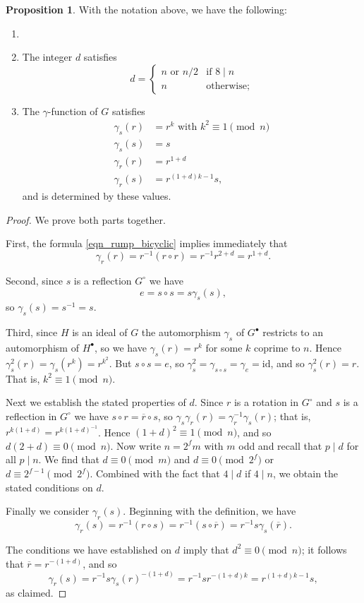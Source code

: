 \documentclass[reqno]{amsart}
\theoremstyle{definition}
\newtheorem{proposition}[theorem]{Proposition}
\renewcommand{\bar}{\overline}
\newcommand{\id}{\mathrm{id}}
\begin{document}
\begin{proposition} \label{prop_bicylic_necessary} 
With the notation above, we have the following:
\begin{enumerate}
\item[]
\item The integer $ d $ satisfies
\[ d= \begin{cases} 
n \mbox{ or } n/2 & \mbox{if } 8 \mid n \\
n & \mbox{otherwise;} \end{cases} \]
\item The $ \gamma $-function of $ G $ satisfies
\begin{align*}
\gamma_{s}(r) &= r^{k} \mbox{ with } k^{2} \equiv 1 \pmod{n} \\
\gamma_{s}(s) &= s \\
\gamma_{r}(r) &= r^{1+d} \\
\gamma_{r}(s) &= r^{(1+d)k-1}s,
\end{align*}
and is determined by these values. 
\end{enumerate}
\end{proposition}
\begin{proof}
We prove both parts together. 

First, the formula \eqref{eqn_rump_bicyclic} implies immediately that
\[ \gamma_{r}(r) = r^{-1}(r \circ r) = r^{-1}r^{2+d} = r^{1+d}. \]

Second, since $ s $ is a reflection $ G^{\circ} $ we have 
\[ e = s \circ s = s \gamma_{s}(s), \]
so $ \gamma_{s}(s)= s^{-1} = s $.

Third, since $ H $ is an ideal of $ G $ the automorphism $ \gamma_{s} $ of $ G^{\bullet} $ restricts to an automorphism of $ H^{\bullet} $, so we have $ \gamma_{s}(r) = r^{k} $ for some $ k $ coprime to $ n $. Hence $ \gamma_{s}^{2}(r) = \gamma_s(r^k)=r^{k^{2}} $. But $ s \circ s = e $, so $ \gamma_{s}^{2} =  \gamma_{s \circ s} = \gamma_{e} = \id $, and so $ \gamma_{s}^{2}(r) = r $. That is, $ k^{2} \equiv 1 \pmod{n} $. 

Next we establish the stated properties of $ d $. Since $ r $ is a rotation in $ G^{\circ} $ and $ s $ is a reflection in $ G^{\circ} $ we have $ s \circ r = \bar{r} \circ s $, so $ \gamma_{s}\gamma_{r}(r) = \gamma_{r}^{-1}\gamma_{s}(r) $; that is, $ r^{k(1+d)} = r^{k(1+d)^{-1}} $. Hence $ (1+d)^{2} \equiv 1 \pmod{n} $, and so $ d(2+d) \equiv 0 \pmod{n} $. Now write $ n=2^{f}m $ with $ m $ odd and recall that $ p \mid d $ for all $ p \mid n $. We find that $ d \equiv 0 \pmod{m} $ and $ d \equiv 0 \pmod{2^{f}} $ or $ d \equiv 2^{f-1} \pmod{2^{f}} $. Combined with the fact that $ 4 \mid d $ if $ 4 \mid n $, we obtain the stated conditions on $ d $. 

Finally we consider $ \gamma_{r}(s) $. Beginning with the definition, we have
\[ \gamma_{r}(s) = r^{-1}(r \circ s) = r^{-1}(s \circ \bar{r}) = r^{-1}s \gamma_{s}(\bar{r}). \]

The conditions we have established on $ d $ imply that $ d^{2} \equiv 0 \pmod{n} $; it follows that $ \bar{r} = r^{-(1+d)} $, and so 
\[ \gamma_{r}(s) = r^{-1}s \gamma_{s}(r)^{-(1+d)} = r^{-1}s r^{-(1+d)k} = r^{(1+d)k-1}s, \]
as claimed. 
\end{proof}
\end{document}
